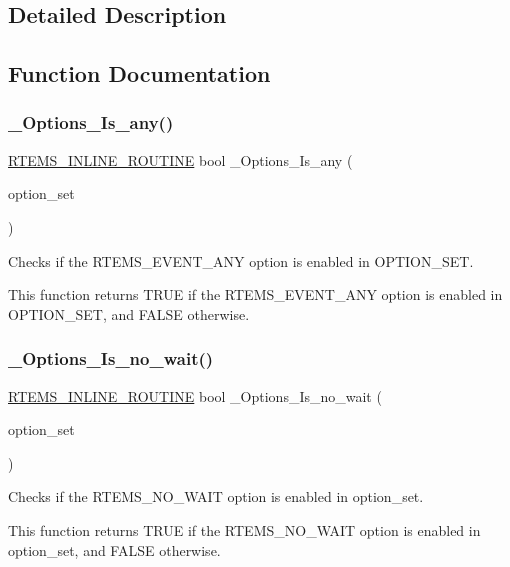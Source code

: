\subsection{Detailed Description}


\subsection{Function Documentation}
\mbox{\label{group__ClassicOptionsImpl_gacd5bef15cf9d6ecb38b4904496d56147}} 
\subsubsection{\texorpdfstring{\_Options\_Is\_any()}{\_Options\_Is\_any()}}
{\footnotesize\ttfamily \mbox{\hyperlink{group__RTEMSScoreBaseDefs_gac216239df231d5dbd15e3520b0b9313f}{R\+T\+E\+M\+S\+\_\+\+I\+N\+L\+I\+N\+E\+\_\+\+R\+O\+U\+T\+I\+NE}} bool \+\_\+\+Options\+\_\+\+Is\+\_\+any (\begin{DoxyParamCaption}\item[{\mbox{\hyperlink{group__ClassicOptions_gad26685eb0e60a9650082935c31920e29}{rtems\+\_\+option}}}]{option\+\_\+set }\end{DoxyParamCaption})}



Checks if the R\+T\+E\+M\+S\+\_\+\+E\+V\+E\+N\+T\+\_\+\+A\+NY option is enabled in O\+P\+T\+I\+O\+N\+\_\+\+S\+ET. 

This function returns T\+R\+UE if the R\+T\+E\+M\+S\+\_\+\+E\+V\+E\+N\+T\+\_\+\+A\+NY option is enabled in O\+P\+T\+I\+O\+N\+\_\+\+S\+ET, and F\+A\+L\+SE otherwise. \mbox{\label{group__ClassicOptionsImpl_gad7266fa291de08576f76366360c86f0a}} 
\subsubsection{\texorpdfstring{\_Options\_Is\_no\_wait()}{\_Options\_Is\_no\_wait()}}
{\footnotesize\ttfamily \mbox{\hyperlink{group__RTEMSScoreBaseDefs_gac216239df231d5dbd15e3520b0b9313f}{R\+T\+E\+M\+S\+\_\+\+I\+N\+L\+I\+N\+E\+\_\+\+R\+O\+U\+T\+I\+NE}} bool \+\_\+\+Options\+\_\+\+Is\+\_\+no\+\_\+wait (\begin{DoxyParamCaption}\item[{\mbox{\hyperlink{group__ClassicOptions_gad26685eb0e60a9650082935c31920e29}{rtems\+\_\+option}}}]{option\+\_\+set }\end{DoxyParamCaption})}



Checks if the R\+T\+E\+M\+S\+\_\+\+N\+O\+\_\+\+W\+A\+IT option is enabled in option\+\_\+set. 

This function returns T\+R\+UE if the R\+T\+E\+M\+S\+\_\+\+N\+O\+\_\+\+W\+A\+IT option is enabled in option\+\_\+set, and F\+A\+L\+SE otherwise. 